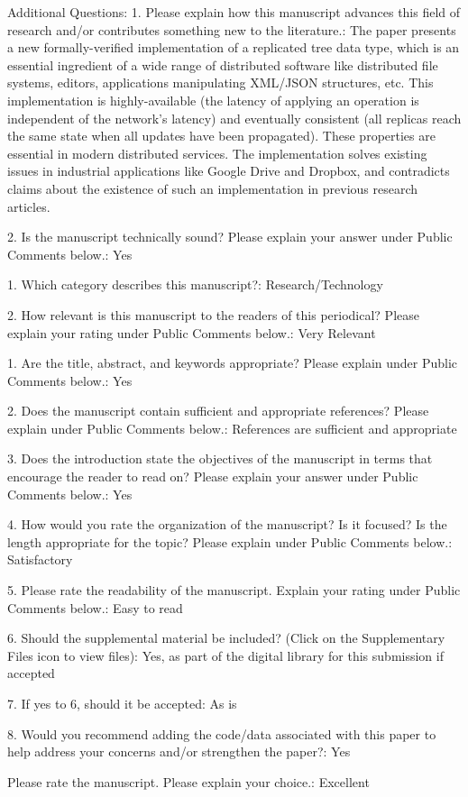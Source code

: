 \documentclass[10pt]{article}
\begin{document}
\begin{spverbatim}
Additional Questions:
1.  Please explain how this manuscript advances this field of research and/or contributes something new to the literature.: The paper presents a new formally-verified implementation of a replicated tree data type, which is an essential ingredient of a wide range of distributed software like distributed file systems, editors, applications manipulating XML/JSON structures, etc. This implementation is highly-available (the latency of applying an operation is independent of the network's latency) and eventually consistent (all replicas reach the same state when all updates have been propagated). These properties are essential in modern distributed services. The implementation solves existing issues in industrial applications like Google Drive and Dropbox, and contradicts claims about the existence of such an implementation in previous research articles.

2. Is the manuscript technically sound? Please explain your answer under Public Comments below.: Yes

1. Which category describes this manuscript?: Research/Technology

2. How relevant is this manuscript to the readers of this periodical? Please explain your rating under Public Comments below.: Very Relevant

1. Are the title, abstract, and keywords appropriate? Please explain under Public Comments below.: Yes

2. Does the manuscript contain sufficient and appropriate references? Please explain under Public Comments below.: References are sufficient and appropriate

3. Does the introduction state the objectives of the manuscript in terms that encourage the reader to read on? Please explain your answer under Public Comments below.: Yes

4. How would you rate the organization of the manuscript? Is it focused? Is the length appropriate for the topic? Please explain under Public Comments below.: Satisfactory

5. Please rate the readability of the manuscript. Explain your rating under Public Comments below.: Easy to read

6. Should the supplemental material be included? (Click on the Supplementary Files icon to view files): Yes, as part of the digital library for this submission if accepted

7. If yes to 6, should it be accepted: As is

8. Would you recommend adding the code/data associated with this paper to help address your concerns and/or strengthen the paper?: Yes

Please rate the manuscript. Please explain your choice.: Excellent
\end{spverbatim}
\end{document}
